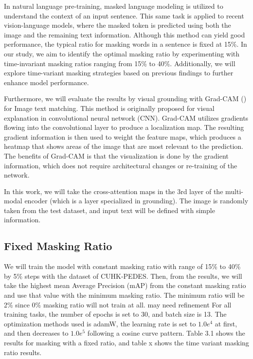 In natural language pre-training, masked language modeling is utilized to understand the context of an input sentence. This same task is applied to recent vision-language models, where the masked token is predicted using both the image and the remaining text information. Although this method can yield good performance, the typical ratio for masking words in a sentence is fixed at 15\%. In our study, we aim to identify the optimal masking ratio by experimenting with time-invariant masking ratios ranging from 15\% to 40\%. Additionally, we will explore time-variant masking strategies based on previous findings to further enhance model performance.

Furthermore, we will evaluate the results by visual grounding with Grad-CAM (\cite{gradcam}) for Image text matching. This method is originally proposed for visual explanation in convolutional neural network (CNN). Grad-CAM utilizes gradients flowing into the convolutional layer to produce a localization map. The resulting gradient information is then used to weight the feature maps, which produces a heatmap that shows areas of the image that are most relevant to the prediction. The benefits of Grad-CAM is that the visualization is done by the gradient information, which does not require architectural changes or re-training of the network.

In this work, we will take the cross-attention maps in the 3rd layer of the multi-modal encoder (which is a layer specialized in grounding). The image is randomly taken from the test dataset, and input text will be defined with simple information.

\subsection{Fixed Masking Ratio}
We will train the model with constant masking ratio with range of 15\% to 40\% by 5\% steps with the dataset of CUHK-PEDES. Then, from the results, we will take the highest mean Average Precision (mAP) from the constant masking ratio and use that value with the minimum masking ratio. The minimum ratio will be 2\% since 0\% masking ratio will not train at all. 
{\color{red} may need refinement}
For all training tasks, the number of epochs is set to 30, and batch size is 13. The optimization methods used is adamW, the learning rate is set to $1.0e^4$ at first, and then decreases to $1.0e^5$ following a cosine curve pattern. Table 3.1 shows the results for masking with a fixed ratio, and table x shows the time variant masking ratio results.


